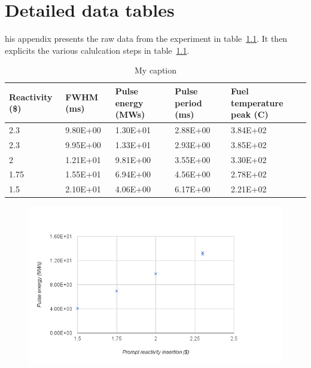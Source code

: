 \chapter{Detailed data tables}
\label{app:app01}

his appendix presents the raw data from the experiment in table~\ref{tab:data}. It then explicits the various calulcation steps in table~\ref{tab:data}.

\begin{table}[!htb]
\centering
\caption{My caption}
\label{tab:data}
\begin{tabular}{lllll}
Reactivity (\$) & FWHM (ms) & Pulse energy (MWs) & Pulse period (ms) & Fuel temperature peak (C) \\ \hline\hline
2.3                              & 9.80E+00    & 1.30E+01              & 2.88E+00            & 3.84E+02              \\
2.3                              & 9.95E+00    & 1.33E+01              & 2.93E+00            & 3.85E+02              \\
2                                & 1.21E+01    & 9.81E+00              & 3.55E+00            & 3.30E+02              \\
1.75                             & 1.55E+01    & 6.94E+00              & 4.56E+00            & 2.78E+02              \\
1.5                              & 2.10E+01    & 4.06E+00              & 6.17E+00            & 2.21E+02             
\end{tabular}
\end{table}






\begin{figure}[t!]
	\centering
	\includegraphics[height=0.4\textheight]{figa/energy.png}
	\label{fig:energy}
\end{figure}


